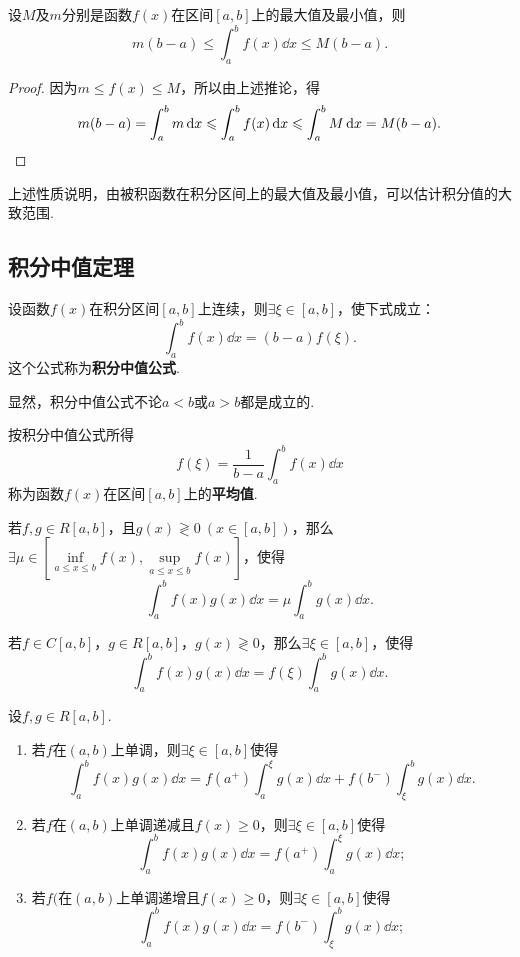 \begin{property}\label{theorem:定积分.定积分性质6}
设\(M\)及\(m\)分别是函数\(f(x)\)在区间\([a,b]\)上的最大值及最小值，则\[
m(b-a) \leqslant \int_a^b f(x) \dd{x} \leqslant M(b-a).
\]
\begin{proof}
因为\(m \leqslant f(x) \leqslant M\)，所以由上述推论，得\[
m(b-a) = \int_a^b m \dd{x} \leqslant \int_a^b f(x) \dd{x} \leqslant \int_a^b M \dd{x} = M(b-a).
\qedhere
\]
\end{proof}
\end{property}
上述性质说明，由被积函数在积分区间上的最大值及最小值，可以估计积分值的大致范围.

\subsection{积分中值定理}
\begin{theorem}[定积分中值定理]\label{theorem:定积分.积分中值定理0}
设函数\(f(x)\)在积分区间\([a,b]\)上连续，则\(\exists\xi\in[a,b]\)，使下式成立：\[
\int_a^b f(x) \dd{x} = (b-a) f(\xi).
\]这个公式称为\textbf{积分中值公式}.
\end{theorem}
显然，积分中值公式不论\(a<b\)或\(a>b\)都是成立的.

按积分中值公式所得\[
f(\xi) = \frac{1}{b-a} \int_a^b f(x) \dd{x}
\]称为函数\(f(x)\)在区间\([a,b]\)上的\textbf{平均值}.

\begin{theorem}[积分第一中值定理]\label{theorem:定积分.积分中值定理1}
若\(f,g \in R[a,b]\)，且\(g(x) \gtrless 0\ (x\in[a,b])\)，那么\(\exists\mu\in\left[\inf\limits_{a \leqslant x \leqslant b} f(x),\sup\limits_{a \leqslant x \leqslant b} f(x)\right]\)，使得\[
\int_a^b f(x) g(x) \dd{x} = \mu \int_a^b g(x) \dd{x}.
\]
\end{theorem}

\begin{corollary}\label{theorem:定积分.积分中值定理1推论1}
若\(f \in C[a,b]\)，\(g \in R[a,b]\)，\(g(x) \gtrless 0\)，那么\(\exists\xi\in[a,b]\)，使得\[
\int_a^b f(x) g(x) \dd{x} = f(\xi) \int_a^b g(x) \dd{x}.
\]
\end{corollary}

\begin{theorem}[积分第二中值定理]\label{theorem:定积分.积分中值定理2}
设\(f,g \in R[a,b]\).\begin{enumerate}
\item 若\(f\)在\((a,b)\)上单调，则\(\exists \xi \in [a,b]\)使得\[
\int_a^b f(x) g(x) \dd{x} = f(a^+) \int_a^{\xi} g(x) \dd{x} + f(b^-) \int_{\xi}^b g(x) \dd{x}.
\]
\item 若\(f\)在\((a,b)\)上单调递减且\(f(x) \geqslant 0\)，则\(\exists \xi \in [a,b]\)使得\[
\int_a^b f(x) g(x) \dd{x} = f(a^+) \int_a^{\xi} g(x) \dd{x};
\]
\item 若\(f(\)在\((a,b)\)上单调递增且\(f(x) \geqslant 0\)，则\(\exists \xi \in [a,b]\)使得\[
\int_a^b f(x) g(x) \dd{x} = f(b^-) \int_{\xi}^b g(x) \dd{x};
\]
\end{enumerate}
\end{theorem}

